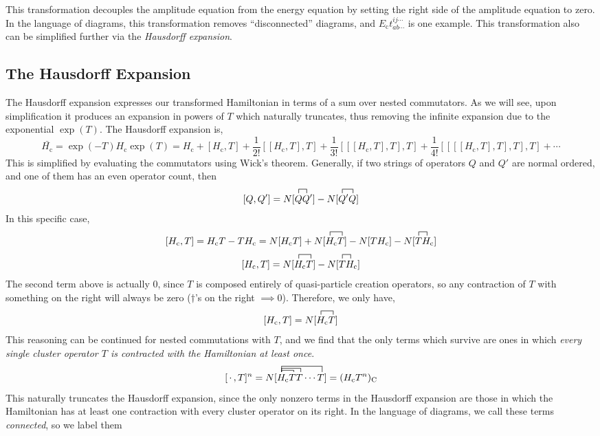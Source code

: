 \documentclass{article}
\newcommand{\fctr}{\contraction}
\newcommand{\Ec}{E_{\mathrm{c}}}
\newcommand{\Hc}{H_{\mathrm{c}}}
\begin{document}
This transformation decouples the amplitude equation from the energy equation
by setting the right side of the amplitude equation to zero. 
In the language of diagrams, this transformation removes ``disconnected'' diagrams,
and $\Ec t_{ab \cdots}^{ij \cdots}$ is one example. 
This transformation also can be simplified further via the \textit{Hausdorff expansion}.

\subsection{The Hausdorff Expansion}
The Hausdorff expansion expresses our transformed Hamiltonian in
terms of a sum over nested commutators. As we will see, upon simplification it produces 
an expansion in powers of $T$ which naturally truncates, thus removing the infinite 
expansion due to the exponential $\exp(T)$. 
The Hausdorff expansion is,
\[ \bar{\Hc} = \exp(-T) \Hc \exp(T) = \Hc + [\Hc,T] + \frac{1}{2!} [[\Hc,T],T] + 
  \frac{1}{3!} [[[\Hc,T],T],T] +  \frac{1}{4!} [[[[\Hc,T],T],T],T] + \cdots   \]
This is simplified by evaluating the commutators using Wick's theorem.
Generally, if two strings of operators $Q$ and $Q'$ are normal ordered, 
and one of them has an even operator count, then 
\[ [Q, Q'] =  N[\fctr{}{Q}{}{Q} Q Q'] - N[\fctr{}{Q}{'}{Q} Q' Q ] \]
In this specific case, 
\[ [\Hc, T] = \Hc T - T\Hc = N[\Hc T] + N[\fctr{}{H}{{}_\mathrm{c}}{T}H_\mathrm{c}T]
  - N[T \Hc] - N[\fctr{}{T}{}{H} T H_\mathrm{c}] \]
\[ [\Hc, T] =  N[\fctr{}{H}{{}_\mathrm{c}}{T}H_\mathrm{c}T] - N[\fctr{}{T}{}{H} T H_\mathrm{c}] \]
The second term above is actually 0, since $T$ is composed entirely 
of quasi-particle creation operators, so any contraction of $T$ with something on the right
will always be zero ($\dagger$'s on the right $\implies 0$). Therefore, we only have,
\[ [\Hc, T] =  N[\fctr{}{H}{{}_\mathrm{c}}{T}H_\mathrm{c}T] \]
This reasoning can be continued for nested commutations with $T$,
and  we find that the only terms which survive are ones in which \textit{every single
cluster operator $T$ is contracted with the Hamiltonian at least once}.
\[
  [\,\cdot\,,T]^n
=
N[
  \fctr[1.5ex]{}{H}{{}_\mathrm{c}TT\cdots}{T}
  \fctr[1.0ex]{}{H}{{}_\mathrm{c}T}{T}
  \fctr[0.5ex]{}{H}{{}_\mathrm{c}}{T}
  H_\mathrm{c} TT\cdots T
]
=
  (H_\mathrm{c} T^n)_\mathrm{C}
\]
This naturally truncates the Hausdorff expansion, since the only nonzero 
terms in the Hausdorff expansion are those
in which the Hamiltonian has at least one contraction with every cluster
operator on its right. 
In the language of diagrams, we call these terms \textit{connected}, so we label them
\end{document}
